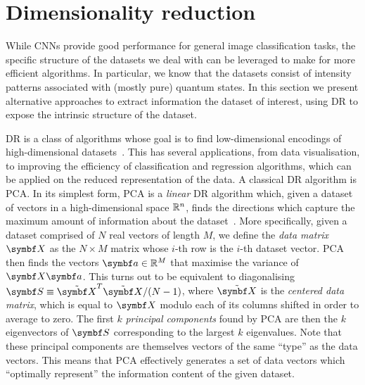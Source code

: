 \section{Dimensionality reduction}
\label{sec:VVBs:dimensionality_reduction}

While CNNs provide good performance for general image classification tasks, the specific structure of the datasets we deal with can be leveraged to make for more efficient algorithms. In particular, we know that the datasets consist of intensity patterns associated with (mostly pure) quantum states.
In this section we present alternative approaches to extract information the dataset of interest, using \ac{DR} to expose the intrinsic structure of the dataset.


\acf{DR} is a class of algorithms whose goal is to find low-dimensional encodings of high-dimensional datasets~\cite{cunningham2008dimension,fodor2002survey}.
This has several applications, from data visualisation, to improving the efficiency of classification and regression algorithms, which can be applied on the reduced representation of the data.
A classical \ac{DR} algorithm is \acf{PCA}.
In its simplest form, \ac{PCA} is a \emph{linear} \ac{DR} algorithm which, given a dataset of vectors in a high-dimensional space ${\mathbb{R}}^n$, finds the directions which capture the maximum amount of information about the dataset~\cite{jolliffe2011principal,jolliffe2016principal}.
More specifically, given a dataset comprised of $N$ real vectors of length $M$, we define the \emph{data matrix} $\bs X$ as the $N\times M$ matrix whose $i$-th row is the $i$-th dataset vector. \ac{PCA} then finds the vectors $\bs a\in\RR^{M}$ that maximise the variance of $\bs X\bs a$. This turns out to be equivalent to diagonalising $\bs S\equiv \tilde{\bs X}^T\tilde{\bs X}/(N-1)$, where $\tilde{\bs X}$ is the \emph{centered data matrix}, which is equal to $\bs X$ modulo each of its columns shifted in order to average to zero.
The first $k$ \emph{principal components} found by \ac{PCA} are then the $k$ eigenvectors of $\bs S$ corresponding to the largest $k$ eigenvalues.
Note that these principal components are themselves vectors of the same ``type'' as the data vectors. This means that \ac{PCA} effectively generates a set of data vectors which ``optimally represent'' the information content of the given dataset.


